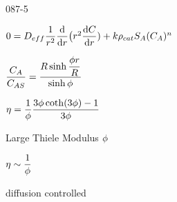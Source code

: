 \begin{mitframe}{087-5}

        
\begin{listone}

	\item $0=\elecdisplace_{eff}\dfrac{1}{\pos^2}\dfrac{\mathrm{d}}{\mathrm{d}\pos}\big(\pos^2\dfrac{\mathrm{d}\conc}{\mathrm{d}\pos})+\thermcond\dens_{cat}\entropy_{\helmholtz}(\conc_{\helmholtz})^n$
    
    \begin{listtwo}
    	
        \item $\dfrac{\conc_{\helmholtz}}{\conc_{\helmholtz\entropy}}=\dfrac{\gasconst\sinh\dfrac{\eleccoeff\pos}{\gasconst}}{\sinh\eleccoeff}$
        
        \item $\intrinsvisc=\dfrac{1}{\eleccoeff}\dfrac{3\eleccoeff\coth(3\eleccoeff)-1}{3\eleccoeff}$
        
        \item Large Thiele Modulus $\eleccoeff$
        
        \begin{listthree}
        
        	\item $\intrinsvisc\sim\dfrac{1}{\eleccoeff}$
            
            \item diffusion controlled
            
        \end{listthree}
	
    \end{listtwo}

\end{listone}        

\end{mitframe}